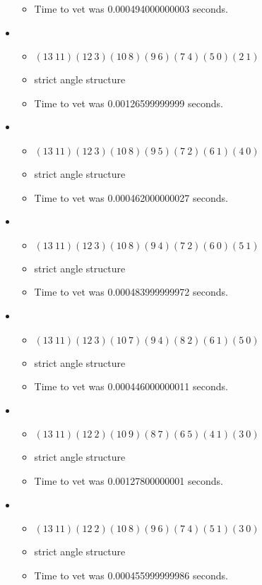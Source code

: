 \documentclass{article}
\begin{document}
\begin{itemize}
\begin{itemize}
      \item Time to vet was 0.000494000000003 seconds.
\end{itemize}
\item \begin{itemize}
      \item $(13\ 11)(12\ 3)(10\ 8)(9\ 6)(7\ 4)(5\ 0)(2\ 1)$
      \item strict angle structure
      \item Time to vet was 0.00126599999999 seconds.
\end{itemize}
\item \begin{itemize}
      \item $(13\ 11)(12\ 3)(10\ 8)(9\ 5)(7\ 2)(6\ 1)(4\ 0)$
      \item strict angle structure
      \item Time to vet was 0.000462000000027 seconds.
\end{itemize}
\item \begin{itemize}
      \item $(13\ 11)(12\ 3)(10\ 8)(9\ 4)(7\ 2)(6\ 0)(5\ 1)$
      \item strict angle structure
      \item Time to vet was 0.000483999999972 seconds.
\end{itemize}
\item \begin{itemize}
      \item $(13\ 11)(12\ 3)(10\ 7)(9\ 4)(8\ 2)(6\ 1)(5\ 0)$
      \item strict angle structure
      \item Time to vet was 0.000446000000011 seconds.
\end{itemize}
\item \begin{itemize}
      \item $(13\ 11)(12\ 2)(10\ 9)(8\ 7)(6\ 5)(4\ 1)(3\ 0)$
      \item strict angle structure
      \item Time to vet was 0.00127800000001 seconds.
\end{itemize}
\item \begin{itemize}
      \item $(13\ 11)(12\ 2)(10\ 8)(9\ 6)(7\ 4)(5\ 1)(3\ 0)$
      \item strict angle structure
      \item Time to vet was 0.000455999999986 seconds.

\end{itemize}
\end{itemize}
\end{document}
